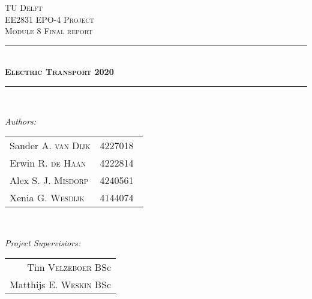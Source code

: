 \documentclass[12pt]{scrreprt}
\begin{document}
\begin{titlepage}

\newcommand{\HRule}{\rule{\linewidth}{0.5mm}} %

\center %
 

\textsc{\LARGE TU Delft}\\[1.5cm] %
\textsc{\Large EE2831 EPO-4 Project}\\[0.5cm] %
\textsc{\large Module 8 Final report}\\[0.5cm] %


\HRule \\[0.4cm]
\textsc{\huge \bfseries Electric Transport 2020}\\[0.2cm] %
\HRule \\[1.5cm]
 

\begin{minipage}{0.45\textwidth}
\begin{flushleft} \large
\emph{Authors:}\\
\begin{tabular}{ll}
Sander A. \textsc{van Dijk} & 4227018\\
Erwin R. \textsc{de Haan} & 4222814\\
Alex S. J. \textsc{Misdorp} & 4240561\\
Xenia G. \textsc{Wesdijk} & 4144074\

\end{tabular}

\end{flushleft}
\end{minipage}
~
\begin{minipage}{0.45\textwidth}
\begin{flushright} \large
\emph{Project Supervisiors:} \\
\begin{tabular}{r}
Tim \textsc{Velzeboer} BSc\\
Matthijs E. \textsc{Weskin} BSc\\
\end{tabular}
\end{flushright}
\end{minipage}\\[1.5cm]


\end{titlepage}
\end{document}
